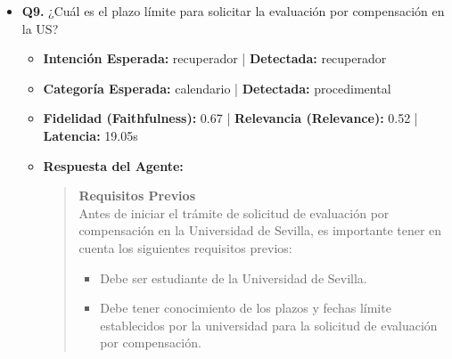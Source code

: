 \documentclass[12pt,a4paper,oneside]{report}
\begin{document}
\begin{itemize}
\begin{itemize}
                \begin{itemize}
                  \item BOJA25-508-00085-6229-01\_00319829.pdf (Página 38)
                  \item \href{https://idus.us.es/items/fe23d2cc-da1e-4156-b81a-722d941e0789}{Las llaves de la sabiduria, llaves de la iglesia: Sermon que el dia de el...}
                  \item \href{https://fefp.us.es/sites/fefp/files/Contenido/Estudios/SEMANAS+LECTIVAS+2019-2020.docx}{SEMANAS LECTIVAS CURSO 2019-2020 Cortesia de WinCalendar...}
                  \item calendario-academico-2025-2026-cg.pdf (Página 7)
                  \item BOJA25-508-00085-6229-01\_00319829.pdf (Página 13)
                  \item BOJA25-508-00085-6229-01\_00319829.pdf (Página 8)
                  \item \href{https://biologia.us.es/sites/biologia/files/doc/Estudios/Calendario\_normativa/CALENDARIO+ACADÉMICO+FACULTAD+DE+BIOLOGÍA.pdf}{Calendario académico facultad de biología}
                  \item \href{https://cicus.us.es/28ene-·-concierto-de-santo-tomas/}{28ENE   CONCIERTO DE SANTO TOMÁS - CICUS   Centro de...}
                \end{itemize}
        \end{itemize}

  
\item \textbf{Q9.} ¿Cuál es el plazo límite para solicitar la evaluación por compensación en la US? \\
        \begin{itemize}
          \item \textbf{Intención Esperada:} recuperador | \textbf{Detectada:} recuperador
          \item \textbf{Categoría Esperada:} calendario | \textbf{Detectada:} procedimental
          \item \textbf{Fidelidad (Faithfulness):} 0.67 | \textbf{Relevancia (Relevance):} 0.52 | \textbf{Latencia:} 19.05s
          \item \textbf{{Respuesta del Agente:}} \\
                \begin{quote}

\noindent\textbf{Requisitos Previos}\\
Antes de iniciar el trámite de solicitud de evaluación por compensación en la Universidad de Sevilla, es importante tener en cuenta los siguientes requisitos previos:
\begin{itemize}
  \item Debe ser estudiante de la Universidad de Sevilla.
  \item Debe tener conocimiento de los plazos y fechas límite establecidos por la universidad para la solicitud de evaluación por compensación.
\end{itemize}



\end{quote}
\end{itemize}
\end{itemize}
\end{document}
